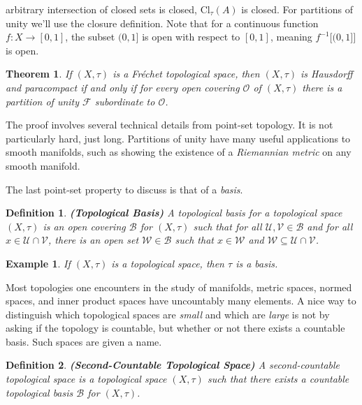 \documentclass{article}
\theoremstyle{plain}
\newtheorem{theorem}{Theorem}[section]
\theoremstyle{normal}
\newtheorem{definition}{Definition}[section]
\newtheorem{example}{Example}[section]
\begin{document}
        arbitrary intersection of closed sets is closed, $\textrm{Cl}_{\tau}(A)$
        is closed. For partitions of unity we'll use the closure definition.
        Note that for a continuous function $f:X\rightarrow[0,1]$, the subset
        $(0,1]$ is open with respect to $[0,1]$, meaning $f^{-1}\big[(0,1]\big]$
        is open.
        \begin{theorem}
            If $(X,\tau)$ is a Fr\'{e}chet topological space, then $(X,\tau)$ is
            Hausdorff and paracompact if and only if for every open covering
            $\mathcal{O}$ of $(X,\tau)$ there is a partition of unity
            $\mathcal{F}$ subordinate to $\mathcal{O}$.
        \end{theorem}
        The proof involves several technical details from point-set topology.
        It is not particularly hard, just long. Partitions of unity have many
        useful applications to smooth manifolds, such as showing the existence
        of a \textit{Riemannian metric} on any smooth manifold.
        \par\hfill\par
        The last point-set property to discuss is that of a \textit{basis}.
        \begin{definition}{\textbf{(Topological Basis)}}
            A topological basis for a topological space $(X,\tau)$ is an open
            covering $\mathcal{B}$ for $(X,\tau)$ such that for all
            $\mathcal{U},\mathcal{V}\in\mathcal{B}$ and for all
            $x\in\mathcal{U}\cap\mathcal{V}$, there is an open set
            $\mathcal{W}\in\mathcal{B}$ such that $x\in\mathcal{W}$ and
            $\mathcal{W}\subseteq\mathcal{U}\cap\mathcal{V}$.
        \end{definition}
        \begin{example}
            If $(X,\tau)$ is a topological space, then $\tau$ is a basis.
        \end{example}
        Most topologies one encounters in the study of manifolds, metric spaces,
        normed spaces, and inner product spaces have uncountably many elements.
        A nice way to distinguish which topological spaces are \textit{small}
        and which are \textit{large} is not by asking if the topology is
        countable, but whether or not there exists a countable basis. Such
        spaces are given a name.
        \begin{definition}{\textbf{(Second-Countable Topological Space)}}
            A second-countable topological space is a topological space
            $(X,\tau)$ such that there exists a countable topological basis
            $\mathcal{B}$ for $(X,\tau)$.
        \end{definition}
\end{document}
